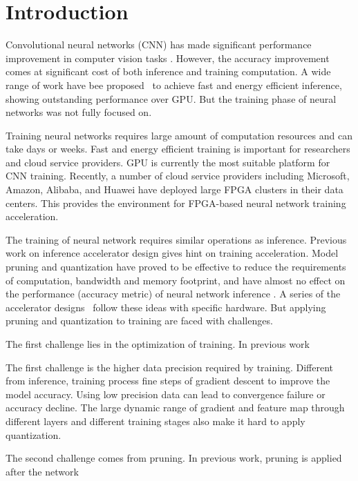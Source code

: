 \section{Introduction}\label{sec:introduction}

Convolutional neural networks (CNN) has made significant performance improvement in computer vision tasks \cite{He2016Deep, Shelhamer2017Fully}. However, the accuracy improvement comes at significant cost of both inference and training computation. A wide range of work have bee proposed~\cite{qiu2016going, han2017ese} to achieve fast and energy efficient inference, showing outstanding performance over GPU. But the training phase of neural networks was not fully focused on. 

Training neural networks requires large amount of computation resources and can take days or weeks. Fast and energy efficient training is important for researchers and cloud service providers. GPU is currently the most suitable platform for CNN training. Recently, a number of cloud service providers including Microsoft, Amazon, Alibaba, and Huawei have deployed large FPGA clusters in their data centers. This provides the environment for FPGA-based neural network training acceleration.

The training of neural network requires similar operations as inference. Previous work on inference accelerator design gives hint on training acceleration. Model pruning and quantization have proved to be effective to reduce the requirements of computation, bandwidth and memory footprint, and have almost no effect on the performance (accuracy metric) of neural network inference \cite{han2015deep}. A series of the accelerator designs~\cite{qiu2016going, han2017ese} follow these ideas with specific hardware. But applying pruning and quantization to training are faced with challenges.

The first challenge lies in the optimization of training. In previous work~\cite{han2015deep}

The first challenge is the higher data precision required by training. Different from inference, training process fine steps of gradient descent to improve the model accuracy. Using low precision data can lead to convergence failure or accuracy decline. The large dynamic range of gradient and feature map through different layers and different training stages also make it hard to apply quantization. 

The second challenge comes from pruning. In previous work, pruning is applied after the network


